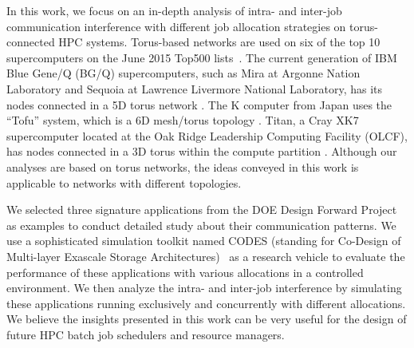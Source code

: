 \documentclass[conference]{IEEEtran}
\newcommand{\TODO}[1]{\hl{TODO: #1}}
\newcommand{\NOTE}[1]{\hl{NOTE: #1}}
\begin{document}
In this work, we focus on an in-depth analysis of intra- and inter-job communication interference with different job allocation strategies on torus-connected HPC systems. Torus-based networks are used on six of the top 10 supercomputers on the June 2015 Top500 lists~\cite{top500}. The current generation of IBM Blue Gene/Q (BG/Q) supercomputers, such as Mira at Argonne Nation Laboratory and Sequoia at Lawrence Livermore National Laboratory, has its nodes connected in a 5D torus network \cite{bgq}. The K computer from Japan uses the ``Tofu'' system, which is a 6D mesh/torus topology \cite{tofu}. Titan, a Cray XK7 supercomputer located at the Oak Ridge Leadership Computing Facility (OLCF), has nodes connected in a 3D torus within the compute partition \cite{titan}. Although our analyses are based on torus networks, the ideas conveyed in this work is applicable to networks with different topologies. 

We selected three signature applications from the DOE Design Forward Project~\cite{designforwardwebpage} as examples to conduct detailed study about their communication patterns. We use a sophisticated simulation toolkit named CODES (standing for Co-Design of Multi-layer Exascale Storage Architectures)~\cite{Jason-2011} as a research vehicle to evaluate the performance of these applications with various allocations in a controlled environment. We then analyze the intra- and inter-job interference by simulating these applications running exclusively and concurrently with different allocations. We believe the insights presented in this work can be very useful for the design of future HPC batch job schedulers and resource managers.

\end{document}

